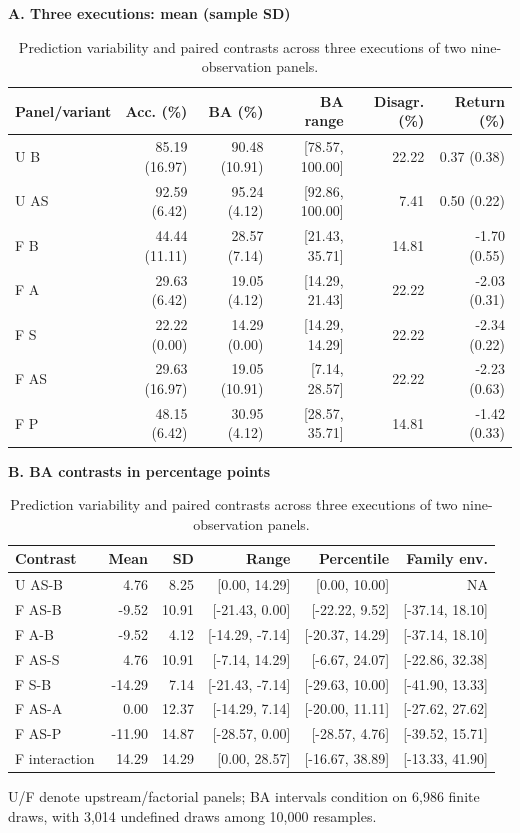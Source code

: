\begin{table}[htb]
\centering\small
\setlength{\tabcolsep}{3pt}
\renewcommand{\arraystretch}{1.15}
\caption{Prediction variability and paired contrasts across three executions of two nine-observation panels.}
\label{tab:repeats}
\textbf{A. Three executions: mean (sample SD)}\par\smallskip
\begin{tabular}{lrrrrr}
\hline
Panel/variant & Acc. (\%) & BA (\%) & BA range & Disagr. (\%) & Return (\%) \\
\hline
U B & 85.19 (16.97) & 90.48 (10.91) & [78.57, 100.00] & 22.22 & 0.37 (0.38) \\
U AS & 92.59 (6.42) & 95.24 (4.12) & [92.86, 100.00] & 7.41 & 0.50 (0.22) \\
F B & 44.44 (11.11) & 28.57 (7.14) & [21.43, 35.71] & 14.81 & -1.70 (0.55) \\
F A & 29.63 (6.42) & 19.05 (4.12) & [14.29, 21.43] & 22.22 & -2.03 (0.31) \\
F S & 22.22 (0.00) & 14.29 (0.00) & [14.29, 14.29] & 22.22 & -2.34 (0.22) \\
F AS & 29.63 (16.97) & 19.05 (10.91) & [7.14, 28.57] & 22.22 & -2.23 (0.63) \\
F P & 48.15 (6.42) & 30.95 (4.12) & [28.57, 35.71] & 14.81 & -1.42 (0.33) \\
\hline
\end{tabular}\par\medskip
\textbf{B. BA contrasts in percentage points}\par\smallskip
\begin{tabular}{lrrrrr}
\hline
Contrast & Mean & SD & Range & Percentile & Family env. \\
\hline
U AS-B & 4.76 & 8.25 & [0.00, 14.29] & [0.00, 10.00] & NA \\
F AS-B & -9.52 & 10.91 & [-21.43, 0.00] & [-22.22, 9.52] & [-37.14, 18.10] \\
F A-B & -9.52 & 4.12 & [-14.29, -7.14] & [-20.37, 14.29] & [-37.14, 18.10] \\
F AS-S & 4.76 & 10.91 & [-7.14, 14.29] & [-6.67, 24.07] & [-22.86, 32.38] \\
F S-B & -14.29 & 7.14 & [-21.43, -7.14] & [-29.63, 10.00] & [-41.90, 13.33] \\
F AS-A & 0.00 & 12.37 & [-14.29, 7.14] & [-20.00, 11.11] & [-27.62, 27.62] \\
F AS-P & -11.90 & 14.87 & [-28.57, 0.00] & [-28.57, 4.76] & [-39.52, 15.71] \\
F interaction & 14.29 & 14.29 & [0.00, 28.57] & [-16.67, 38.89] & [-13.33, 41.90] \\
\hline
\end{tabular}\par\medskip
\begin{minipage}{\textwidth}\footnotesize U/F denote upstream/factorial panels; BA intervals condition on 6,986 finite draws, with 3,014 undefined draws among 10,000 resamples.\end{minipage}
\end{table}
